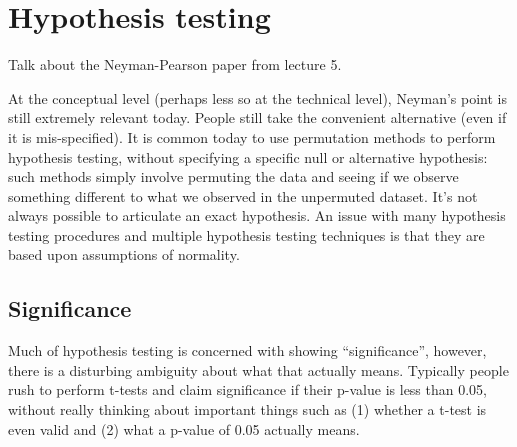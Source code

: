 

\chapter{Hypothesis testing}
\label{ch:testing}







Talk about the Neyman-Pearson paper from lecture 5.

At the conceptual level (perhaps less so at the technical level), Neyman's point is still extremely relevant today. People still take the convenient alternative (even if it is mis-specified). It is common today to use permutation methods to perform hypothesis testing, without specifying a specific null or alternative hypothesis: such methods simply involve permuting the data and seeing if we observe something different to what we observed in the unpermuted dataset. It's not always possible to articulate an exact hypothesis. An issue with many hypothesis testing procedures and multiple hypothesis testing techniques is that they are based upon assumptions of normality.

\section{Significance}

Much of hypothesis testing is concerned with showing ``significance'', however, there is a disturbing ambiguity about what that actually means. Typically people rush to perform t-tests and claim significance if their p-value is less than 0.05, without really thinking about important things such as (1) whether a t-test is even valid and (2) what a p-value of 0.05 actually means. 


%
%
%
%
%
%
%


